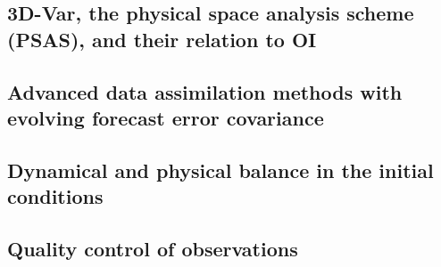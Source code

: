 \subsection{3D-Var, the physical space analysis scheme (PSAS), and their relation to OI}
\label{sub:data_assimilation:3d-var}

\subsection{Advanced data assimilation methods with evolving forecast error covariance}
\label{sub:data_assimilation:advanced}

\subsection{Dynamical and physical balance in the initial conditions}
\label{sub:data_assimilation:balance}

\subsection{Quality control of observations}
\label{sub:data_assimilation:quality}



